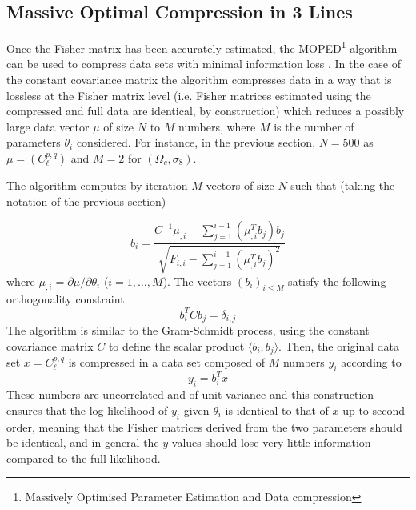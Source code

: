 \documentclass[twocolumn,twocolappendix,nofootinbib,iop]{openjournal}
\newcommand{\FrL}[1]{{\color{cyan}FL: #1}}
\begin{document}
\subsection{Massive Optimal Compression in 3 Lines}


Once the Fisher matrix has been accurately estimated, the MOPED\footnote{Massively Optimised Parameter Estimation and Data compression} algorithm can be used to compress data sets with minimal information loss \citep{2000MNRAS.317..965H,2016PhRvD..93h3525Z, 2017MNRAS.472.4244H}. In the case of the constant covariance matrix the algorithm compresses data in a way that is lossless at the Fisher matrix level (i.e. Fisher matrices estimated using the compressed and full data are identical, by construction)  which reduces a possibly large data vector $\mu$ of size $N$ to $M$ numbers, where $M$ is the number of parameters $\theta_i$ considered. For instance, in the previous section, $N=500$ as $\mu=(C_\ell^{p,q})$ and $M=2$ for $(\Omega_c,\sigma_8)$. 

The algorithm computes by iteration $M$ vectors of size $N$ such that (taking the notation of the previous section)

\begin{equation}
    b_i = \frac{C^{-1}\mu_{,i}-\sum_{j=1}^{i-1}(\mu_{,i}^T b_j)b_j}{\sqrt{F_{i,i}-\sum_{j=1}^{i-1}(\mu_{,i}^T b_j)^2}}
\label{eq:moped}
\end{equation}
where $\mu_{,i}=\partial \mu/\partial \theta_i$ ($i=1,\dots,M$). The vectors $(b_i)_{i\leq M}$ satisfy the following orthogonality constraint
\begin{equation}
    b_i^T C b_j = \delta_{i,j}
\end{equation}
The algorithm is similar to the Gram-Schmidt process, using the constant covariance matrix $C$ to define the scalar product $\langle b_i, b_j\rangle$. Then, the original data set $x=C_\ell^{p,q}$ is compressed in a data set composed of $M$ numbers $y_i$ according to
\begin{equation}
    y_i = b_i^T x
\end{equation}
These numbers are uncorrelated and of unit variance and this construction ensures that the log-likelihood of $y_i$ given  $\theta_i$ is identical to that of $x$ up to second order, meaning that the Fisher matrices derived from the two parameters should be identical, and in general the $y$ values should lose very little information compared to the full likelihood.
\end{document}
